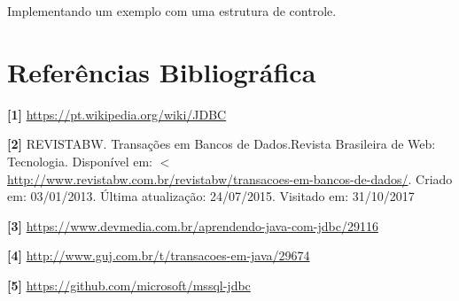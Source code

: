 \documentclass[12pt,a4paper]{article}
\begin{document}
Implementando um exemplo com uma estrutura de controle.






%


\newpage
\section{Referências Bibliográfica}
\noindent \textbf{[1] }\url{https://pt.wikipedia.org/wiki/JDBC}
\\\vspace{0.2cm}

\noindent\textbf{[2]} REVISTABW. Transações em Bancos de Dados.Revista Brasileira de Web: Tecnologia. Disponível em: $<$\url{http://www.revistabw.com.br/revistabw/transacoes-em-bancos-de-dados/}. Criado em: 03/01/2013. Última atualização: 24/07/2015. Visitado em: 31/10/2017 \\\vspace{0.2cm}

\noindent\textbf{[3]} \url{https://www.devmedia.com.br/aprendendo-java-com-jdbc/29116}
\\\vspace{0.2cm}

\noindent\textbf{[4]} \url{http://www.guj.com.br/t/transacoes-em-java/29674}\\\vspace{0.2cm}


\noindent\textbf{[5]} \url{https://github.com/microsoft/mssql-jdbc}
\end{document}
